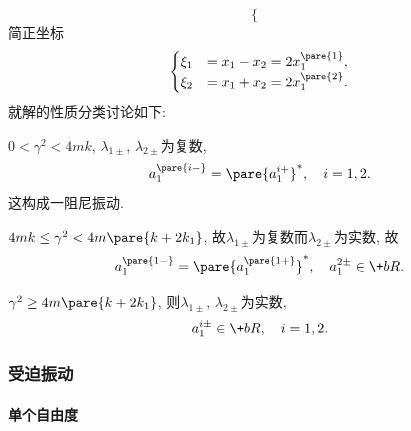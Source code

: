 \documentclass{ctexart}
\begin{document}
\begin{sample}
\begin{ex}
\[\begin{cases}
        \end{cases} \]
        简正坐标
        \[ \begin{cases}
            \xi_1 &= x_1 - x_2 = 2x_1^{\pare{1}}, \\
            \xi_2 &= x_1 + x_2 = 2x_1^{\pare{2}}.
        \end{cases} \]
        就解的性质分类讨论如下:
        \begin{cenum}
            \item $0<\gamma^2<4mk$, $\lambda_{1\pm}$, $\lambda_{2\pm}$为复数,
            \[ a_1^{\pare{i-}} = \pare{a_1^{i+}}^*,\quad i=1,2. \]
            这构成一阻尼振动.
            \item $4mk \le \gamma^2 < 4m\pare{k+2k_1}$, 故$\lambda_{1\pm}$为复数而$\lambda_{2\pm}$为实数, 故
            \[ a_1^{\pare{1-}} = \pare{a_1^{\pare{1+}}}^*,\quad a_1^{2\pm} \in \+bR. \]
            \item $\gamma^2 \ge 4m\pare{k+2k_1}$, 则$\lambda_{1\pm}$, $\lambda_{2\pm}$为实数,
            \[ a_1^{i\pm} \in \+bR,\quad i = 1,2. \]
        \end{cenum}
    \end{ex}
\end{sample}



\subsubsection{受迫振动} %
\label{ssub:受迫振动}

\paragraph{单个自由度} %
\label{par:单个自由度}
\end{document}
